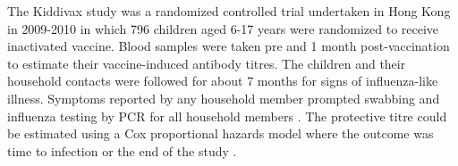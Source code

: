 The Kiddivax study was a randomized controlled trial undertaken in Hong Kong in 2009-2010 in which 796 children aged 6-17 years were randomized to receive inactivated vaccine. Blood samples were taken pre and 1 month post-vaccination to estimate their vaccine-induced antibody titres.  The children and their household contacts were followed for about 7 months for signs of influenza-like illness. Symptoms reported by any household member prompted swabbing and influenza testing by PCR for all household members \citep{Cowling;2013}. The protective titre could be estimated using a Cox proportional hazards model where the outcome was time to infection or the end of the study \citep{Ng;2013}.
